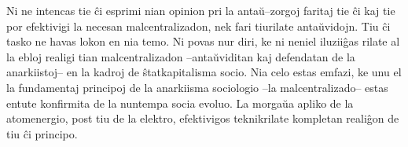 Ni ne intencas tie ĉi esprimi nian opinion pri la antaŭ–zorgoj faritaj tie ĉi kaj tie por efektivigi la necesan malcentralizadon, nek fari tiurilate antaŭvidojn. Tiu ĉi tasko ne havas lokon en nia temo. Ni povas nur diri, ke ni neniel iluziiĝas rilate al la ebloj realigi tian malcentralizadon –antaŭviditan kaj defendatan de la anarkiistoj– en la kadroj de ŝtatkapitalisma socio. Nia celo estas emfazi, ke unu el la fundamentaj principoj de la anarkiisma sociologio –la malcentralizado– estas entute konfirmita de la nuntempa socia evoluo. La morgaŭa apliko de la atomenergio, post tiu de la elektro, efektivigos teknikrilate kompletan realiĝon de tiu ĉi principo.